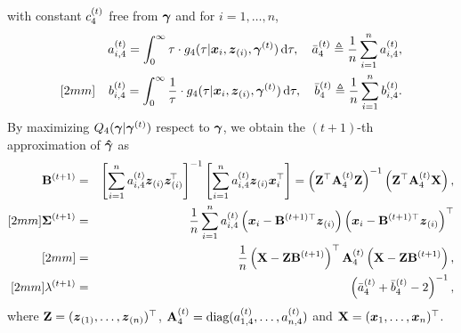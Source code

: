 with constant $\ct{4}$ free from $\bga$ and for $i = 1, \dots, n$, 
\begin{eqnarray*}
    && \at{i,4} = \int_0^\infty \tau \cdot g_4(\tau | \ibx_i, \ibzi, \bgat) \rd \tau, \quad \Bat{4} \teq \frac{1}{n} \sum_{i=1}^{n} \at{i,4}, \\ [2mm]
    && \bt{i,4} = \int_0^\infty \frac{1}{\tau} \cdot g_4(\tau | \ibx_i, \ibzi, \bgat) \rd \tau, \quad \Bbt{4} \teq \frac{1}{n} \sum_{i=1}^{n} \bt{i,4}.
\end{eqnarray*}
By maximizing $Q_4(\bga | \bgat)$ respect to $\bga$, we obtain the $(t+1)$-th approximation of $\hbga$ as
\begin{eqnarray*}
    \bBtI &=& \left[ \sum_{i=1}^n \at{i,4} \ibzi \ibziT \right]^{-1} \left[ \sum_{i=1}^n \at{i,4} \ibzi \ibx_i^\top \right] = \left(\bZ^\top \At{4} \bZ\right)^{-1} \left(\bZ^\top \At{4} \bX\right), \\ [2mm]
    \bSitI &=& \frac{1}{n} \sum_{i=1}^n \at{i,4} \left( \ibx_i - \bB^{(t+1)\top} \ibzi\right) \left( \ibx_i - \bB^{(t+1)\top}\ibzi \right)^\top \\ [2mm]
    &=& \frac{1}{n}\left(\bX - \bZ \bBtI \right)^\top \At{4} \left(\bX - \bZ \bBtI \right), \\ [2mm]
    \latI &=& \left( \Bat{4} + \Bbt{4} - 2 \right)^{-1},
\end{eqnarray*}
where $\bZ = (\ibz_{(1)}, \dots, \ibz_{(n)})^\top$, $\At{4} = \diag(\at{1,4}, \dots, \at{n,4})$ and $\bX = (\ibx_1, \dots, \ibx_n)^\top$.